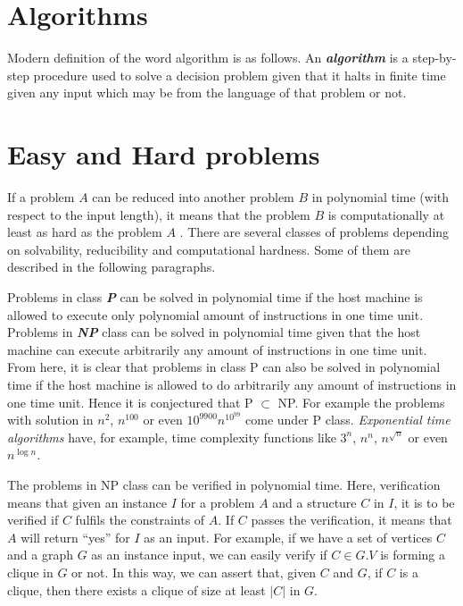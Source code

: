 \section{Algorithms}

Modern definition of the word algorithm is as follows. An \textbf{\textit{algorithm}} is a step-by-step procedure used to solve a decision problem given that it halts in finite time given any input which may be from the language of that problem or not. \cite{Garey1979}

\section{Easy and Hard problems}\label{section:problems-classes}

If a problem $A$ can be reduced into another problem $B$ in polynomial time (with respect to the input length), it means that the problem $B$ is computationally at least as hard as the problem $A$ \cite{Garey1979}. There are several classes of problems depending on solvability, reducibility and computational hardness. Some of them are described in the following paragraphs. 

Problems in class \textbf{\textit{P}} can be solved in polynomial time if the host machine is allowed to execute only polynomial amount of instructions in one time unit. Problems in \textbf{\textit{NP}} class can be solved in polynomial time given that the host machine can execute arbitrarily any amount of instructions in one time unit. From here, it is clear that problems in class P can also be solved in polynomial time if the host machine is allowed to do arbitrarily any amount of instructions in one time unit. Hence it is conjectured that P $\subset$ NP. For example the problems with solution in $n^2$, $n^{100}$ or even $10^{9900}n^{10^{99}}$ come under P class. \textit{Exponential time algorithms} have, for example, time complexity functions like $3^n$, $n^n$, $n^{\sqrt{n}}$ or even $n^{\log n}$.

The problems in NP class can be verified in polynomial time. Here, verification means that given an instance $I$ for a problem $A$ and a structure $C$ in $I$, it is to be verified if $C$ fulfils the constraints of $A$. If $C$ passes the verification, it means that $A$ will return ``yes'' for $I$ as an input. For example, if we have a set of vertices $C$ and a graph $G$ as an instance input, we can easily verify if $C \in G.V$ is forming a clique in $G$ or not. In this way, we can assert that, given $C$ and $G$, if $C$ is a clique, then there exists a clique of size at least $|C|$ in $G$.

